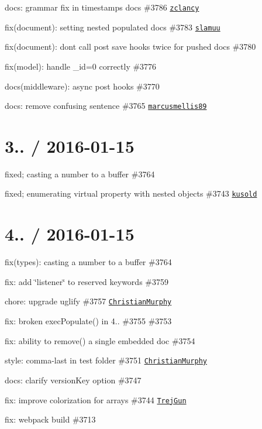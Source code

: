 \begin{DoxyItemize}
\item docs\+: grammar fix in timestamps docs \#3786 \href{https://github.com/zclancy}{\tt zclancy}
\item fix(document)\+: setting nested populated docs \#3783 \href{https://github.com/slamuu}{\tt slamuu}
\item fix(document)\+: don\textquotesingle{}t call post save hooks twice for pushed docs \#3780
\item fix(model)\+: handle {\ttfamily \+\_\+id=0} correctly \#3776
\item docs(middleware)\+: async post hooks \#3770
\item docs\+: remove confusing sentence \#3765 \href{https://github.com/marcusmellis89}{\tt marcusmellis89}
\end{DoxyItemize}

\section*{3.. / 2016-\/01-\/15 }


\begin{DoxyItemize}
\item fixed; casting a number to a buffer \#3764
\item fixed; enumerating virtual property with nested objects \#3743 \href{https://github.com/kusold}{\tt kusold}
\end{DoxyItemize}

\section*{4.. / 2016-\/01-\/15 }


\begin{DoxyItemize}
\item fix(types)\+: casting a number to a buffer \#3764
\item fix\+: add \char`\"{}listener\char`\"{} to reserved keywords \#3759
\item chore\+: upgrade uglify \#3757 \href{https://github.com/ChristianMurphy}{\tt Christian\+Murphy}
\item fix\+: broken exec\+Populate() in 4.. \#3755 \#3753
\item fix\+: ability to remove() a single embedded doc \#3754
\item style\+: comma-\/last in test folder \#3751 \href{https://github.com/ChristianMurphy}{\tt Christian\+Murphy}
\item docs\+: clarify version\+Key option \#3747
\item fix\+: improve colorization for arrays \#3744 \href{https://github.com/TrejGun}{\tt Trej\+Gun}
\item fix\+: webpack build \#3713
\end{DoxyItemize}

